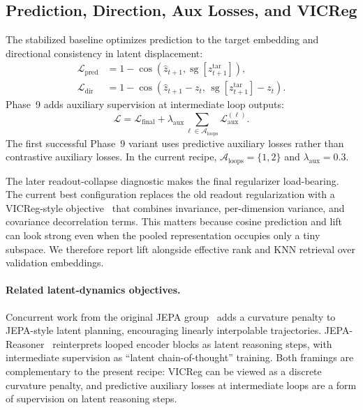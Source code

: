 \subsection{Prediction, Direction, Aux Losses, and VICReg}

The stabilized baseline optimizes prediction to the target embedding and
directional consistency in latent displacement:
\begin{align}
    \mathcal{L}_{\mathrm{pred}}
    &= 1 - \cos(\hat{z}_{t+1}, \operatorname{sg}[z_{t+1}^{\mathrm{tar}}]), \\
    \mathcal{L}_{\mathrm{dir}}
    &= 1 - \cos(\hat{z}_{t+1} - z_t,\,
                \operatorname{sg}[z_{t+1}^{\mathrm{tar}}] - z_t).
\end{align}
Phase~9 adds auxiliary supervision at intermediate loop outputs:
\begin{equation}
    \mathcal{L}
    =
    \mathcal{L}_{\mathrm{final}}
    + \lambda_{\mathrm{aux}}
      \sum_{\ell \in \mathcal{A}_{\mathrm{loops}}}
      \mathcal{L}_{\mathrm{aux}}^{(\ell)}.
    \label{eq:aux_loss}
\end{equation}
The first successful Phase~9 variant uses predictive auxiliary losses
rather than contrastive auxiliary losses.  In the current recipe,
$\mathcal{A}_{\mathrm{loops}}=\{1,2\}$ and
$\lambda_{\mathrm{aux}}=0.3$.

The later readout-collapse diagnostic makes the final regularizer
load-bearing.  The current best configuration replaces the old
readout regularization with a VICReg-style objective~\citep{bardes2022vicreg}
that combines invariance, per-dimension variance, and covariance
decorrelation terms.  This matters because cosine prediction and lift can
look strong even when the pooled representation occupies only a tiny
subspace.  We therefore report lift alongside effective rank and KNN
retrieval over validation embeddings.

\paragraph{Related latent-dynamics objectives.}
Concurrent work from the original JEPA
group~\citep{straightening2026} adds a curvature penalty to
JEPA-style latent planning, encouraging linearly interpolable
trajectories.  JEPA-Reasoner~\citep{jepareasoner2025}
reinterprets looped encoder blocks as latent reasoning steps, with
intermediate supervision as ``latent chain-of-thought'' training.
Both framings are complementary to the present recipe: VICReg can be
viewed as a discrete curvature penalty, and predictive auxiliary losses
at intermediate loops are a form of supervision on latent reasoning
steps.
